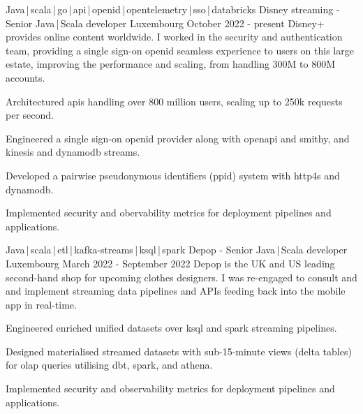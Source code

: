 
\newcommand*{\logo}[2]{\raisebox{-0.2em}{\texttt{[image: \#2]}}\hspace{0.25em}#1}
\newcommand*{\logoonly}[1]{\raisebox{-0.2em}{\texttt{[image: \#1]}}}

\begin{cventries}
    \cventry
    {Java\,|\,scala\,|\,go\,|\,api\,|\,openid\,|\,opentelemetry\,|\,sso\,|\,databricks}
    {\logo{Disney streaming}{../../../images/disney.png} - Senior Java\,|\,Scala developer}
    {Luxembourg}
    {October 2022 - present}
    {Disney+ provides online content worldwide. I worked in the security and authentication team, providing a single sign-on openid seamless experience to users on this large estate, improving the performance and scaling, from handling 300M to 800M accounts.}
    {
        \begin{cvitems}
            \item{Architectured apis handling over 800 million users, scaling up to 250k requests per second.}
            \item{Engineered a single sign-on openid provider along with openapi and smithy, and kinesis and dynamodb streams.}
            \item{Developed a pairwise pseudonymous identifiers (ppid) system with http4s and dynamodb.}
            \item{Implemented security and obervability metrics for deployment pipelines and applications.}
        \end{cvitems}
    }

    \cventry
    {Java\,|\,scala\,|\,etl\,|\,kafka-streams\,|\,ksql\,|\,spark}
    {\logo{Depop}{../../../images/depop.jpg} - Senior Java\,|\,Scala developer}
    {Luxembourg}
    {March 2022 - September 2022}
    {Depop is the UK and US leading second-hand shop for upcoming clothes designers. I was re-engaged to consult and and implement streaming data pipelines and APIs feeding back into the mobile app in real-time.}
    {
        \begin{cvitems}
            \item{Engineered enriched unified datasets over ksql and spark streaming pipelines.}
            \item{Designed materialised streamed datasets with sub-15-minute views (delta tables) for olap queries utilising dbt, spark, and athena.}
            \item{Implemented security and observability metrics for deployment pipelines and applications.}
        \end{cvitems}
    }


\end{cventries}
